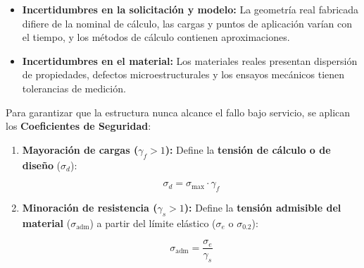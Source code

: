 \begin{itemize}

    \item \textbf{Incertidumbres en la solicitación y modelo:} La geometría real fabricada difiere de la nominal de cálculo, las cargas y puntos de aplicación varían con el tiempo, y los métodos de cálculo contienen aproximaciones.

    \item \textbf{Incertidumbres en el material:} Los materiales reales presentan dispersión de propiedades, defectos microestructurales y los ensayos mecánicos tienen tolerancias de medición.

\end{itemize}



Para garantizar que la estructura nunca alcance el fallo bajo servicio, se aplican los \textbf{Coeficientes de Seguridad}:

\begin{enumerate}

    \item \textbf{Mayoración de cargas ($\gamma_f > 1$):} Define la \textbf{tensión de cálculo o de diseño} ($\sigma_d$):

          \begin{equation}

              \sigma_d = \sigma_{\text{max}} \cdot \gamma_f

          \end{equation}

    \item \textbf{Minoración de resistencia ($\gamma_s > 1$):} Define la \textbf{tensión admisible del material} ($\sigma_{\text{adm}}$) a partir del límite elástico ($\sigma_e$ o $\sigma_{0.2}$):

          \begin{equation}

              \sigma_{\text{adm}} = \frac{\sigma_e}{\gamma_s}

          \end{equation}

\end{enumerate}




